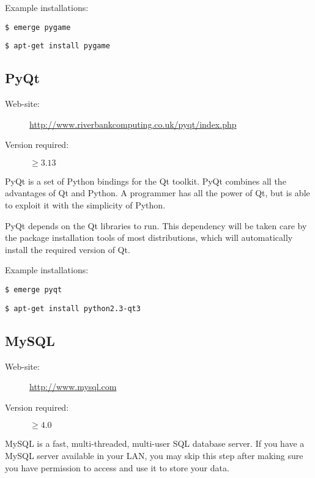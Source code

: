 Example installations:
\begin{lstlisting}[frame=trBL, caption=Installing Pygame python on Gentoo GNU/Linux ,label=lst:instpygameg]
$ emerge pygame
\end{lstlisting}
\begin{lstlisting}[frame=trBL, caption=Installing Pygame python on Debian GNU/Linux ,label=lst:instpygamed]
$ apt-get install pygame
\end{lstlisting}

\subsection{PyQt}
\begin{description}
\item[Web-site:] \url{http://www.riverbankcomputing.co.uk/pyqt/index.php}
\item[Version required:] $\geq3.13$
\end{description}
PyQt is a set of Python bindings for the Qt toolkit. PyQt combines all the advantages of Qt and Python. A programmer has all the power of Qt, but is able to exploit it with the simplicity of Python.

PyQt depends on the Qt libraries to run. This dependency will be taken care by the package installation tools of most distributions, which will automatically install the required version of Qt.

Example installations:
\begin{lstlisting}[frame=trBL, caption=Installing PyQt python on Gentoo GNU/Linux ,label=lst:instpyqtg]
$ emerge pyqt
\end{lstlisting}
\begin{lstlisting}[frame=trBL, caption=Installing PyQt python on Debian GNU/Linux ,label=lst:instpyqtd]
$ apt-get install python2.3-qt3
\end{lstlisting}
\subsection{MySQL}
\begin{description}
\item[Web-site:] \url{http://www.mysql.com}
\item[Version required:] $\geq4.0$
\end{description}
MySQL is a fast, multi-threaded, multi-user SQL database server. If you have a MySQL server available in your LAN, you may skip this step after making sure you have permission to access and use it to store your data.

